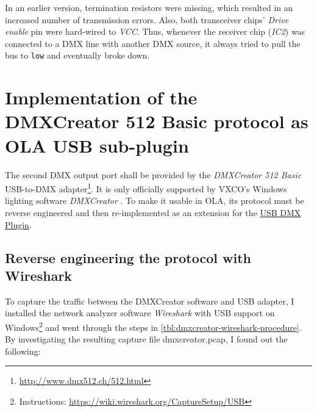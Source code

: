 In an earlier version, termination resistors were missing, which
resulted in an increased number of transmission errors. Also, both
transceiver chips' \emph{Drive enable} pin were hard-wired to
\emph{VCC}. Thus, whenever the receiver chip (\emph{IC2}) was connected
to a DMX line with another DMX source, it always tried to pull the bus
to \colorbox{WhiteSmoke}{\lstinline!low!} and eventually broke down.

\section{Implementation of the DMXCreator 512 Basic protocol as OLA USB
sub-plugin}\label{sec:ola-dmxcreator-plugin}

The second DMX output port shall be provided by the \emph{DMXCreator 512
Basic} USB-to-DMX adapter\footnote{\url{http://www.dmx512.ch/512.html}}.
It is only officially supported by VXCO's Windows lighting software
\emph{DMXCreator} \citep{vxco-dmxcreator-manual}. To make it usable in
OLA, its protocol must be reverse engineered and then re-implemented as
an extension for the \protect\hyperlink{sec:ola-usb-plugin}{USB DMX
Plugin}.

\subsection{Reverse engineering the protocol with
Wireshark}\label{reverse-engineering-the-protocol-with-wireshark}

To capture the traffic between the
DMXCreator software and USB adapter, I installed the network analyzer
software \emph{Wireshark} with USB support on Windows\footnote{Instructions:
  \url{https://wiki.wireshark.org/CaptureSetup/USB}} and went through
the steps in \cref{tbl:dmxcreator-wireshark-procedure}. By investigating
the resulting capture file \gls{dmxcreator.pcap}, I found out the
following:

